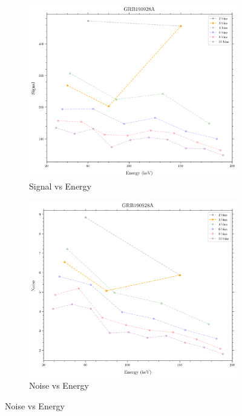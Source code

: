 \documentclass[11pt]{book} %
\begin{document}
\begin{figure}[H]
    \centering
    \begin{subfigure}[b]{0.3\textwidth}
        \centering
        \includegraphics[width=\textwidth]{Pictures/signalvsenergy.png}
        \caption{Signal vs Energy}
    \end{subfigure}
    \begin{subfigure}[b]{0.3\textwidth}  
        \centering 
        \includegraphics[width=\textwidth]{Pictures/noisevsenergy.png}
        \caption{Noise vs Energy}

\end{subfigure}
\end{figure}
\end{document}
